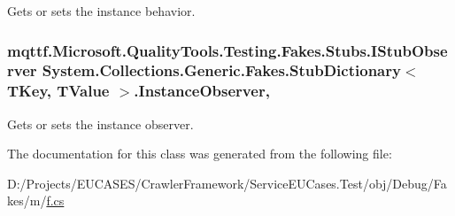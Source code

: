 Gets or sets the instance behavior.

\hypertarget{class_system_1_1_collections_1_1_generic_1_1_fakes_1_1_stub_dictionary_3_01_t_key_00_01_t_value_01_4_a7491938172ec15ca26bf3cec72a013f9}{
\subsubsection[{Instance\-Observer}]{\setlength{\rightskip}{0pt plus 5cm}mqttf.\-Microsoft.\-Quality\-Tools.\-Testing.\-Fakes.\-Stubs.\-I\-Stub\-Observer System.\-Collections.\-Generic.\-Fakes.\-Stub\-Dictionary$<$ T\-Key, T\-Value $>$.Instance\-Observer\hspace{0.3cm}{\ttfamily [get]}, {\ttfamily [set]}}}\label{class_system_1_1_collections_1_1_generic_1_1_fakes_1_1_stub_dictionary_3_01_t_key_00_01_t_value_01_4_a7491938172ec15ca26bf3cec72a013f9}


Gets or sets the instance observer.



The documentation for this class was generated from the following file\-:\begin{DoxyCompactItemize}
\item 
D\-:/\-Projects/\-E\-U\-C\-A\-S\-E\-S/\-Crawler\-Framework/\-Service\-E\-U\-Cases.\-Test/obj/\-Debug/\-Fakes/m/\hyperlink{m_2f_8cs}{f.\-cs}\end{DoxyCompactItemize}
